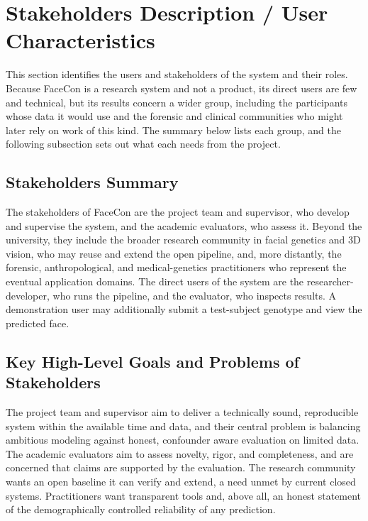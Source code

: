 \section{Stakeholders Description / User Characteristics}
This section identifies the users and stakeholders of the system and their roles. Because FaceCon is a research system and not a product, its direct users are few and technical, but its results concern a wider group, including the participants whose data it would use and the forensic and clinical communities who might later rely on work of this kind. The summary below lists each group, and the following subsection sets out what each needs from the project.

\subsection{Stakeholders Summary}
The stakeholders of FaceCon are the project team and supervisor, who develop and supervise the system, and the academic evaluators, who assess it. Beyond the university, they include the broader research community in facial genetics and 3D vision, who may reuse and extend the open pipeline, and, more distantly, the forensic, anthropological, and medical-genetics practitioners who represent the eventual application domains. The direct users of the system are the researcher-developer, who runs the pipeline, and the evaluator, who inspects results. A demonstration user may additionally submit a test-subject genotype and view the predicted face.

\subsection{Key High-Level Goals and Problems of Stakeholders}
The project team and supervisor aim to deliver a technically sound, reproducible system within the available time and data, and their central problem is balancing ambitious modeling against honest, confounder aware evaluation on limited data. The academic evaluators aim to assess novelty, rigor, and completeness, and are concerned that claims are supported by the evaluation. The research community wants an open baseline it can verify and extend, a need unmet by current closed systems. Practitioners want transparent tools and, above all, an honest statement of the demographically controlled reliability of any prediction.

